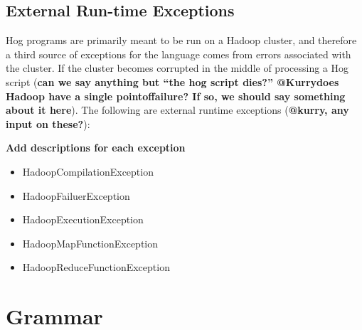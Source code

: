 \documentclass{book}
\begin{document}
\section{External Run-time Exceptions} %
\label{sec:external_run_time_exceptions}

Hog programs are primarily meant to be run on a Hadoop cluster, and therefore a
third source of exceptions for the language comes from errors associated with the
cluster. If the cluster becomes corrupted in the middle of processing a Hog script
(\textbf{can we say anything but ``the hog script dies?'' @Kurry­­­does Hadoop
have a single point­of­failure? If so, we should say something about it here}).
The following are external run­time exceptions (\textbf{@kurry, any input on
these?}):

\textbf{Add descriptions for each exception}

\begin{itemize}
  \item[] HadoopCompilationException
  \item[] HadoopFailuerException
  \item[] HadoopExecutionException
  \item[] HadoopMapFunctionException
  \item[] HadoopReduceFunctionException
\end{itemize}



\chapter{Grammar} %
\label{cha:grammar}
\end{document}
